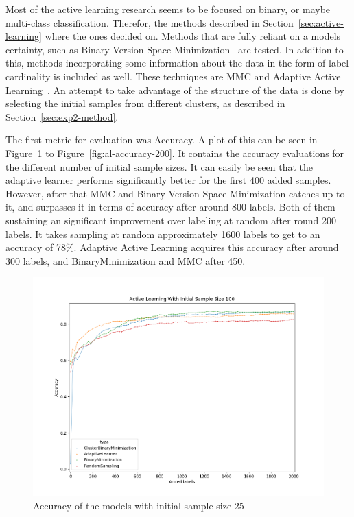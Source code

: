 Most of the active learning research seems to be focused on binary, or maybe multi-class classification.
Therefor, the methods described in Section~\ref{sec:active-learning} where the ones decided on.
Methods that are fully reliant on a models certainty, such as Binary Version Space Minimization~\cite{brinker2006active} are tested.
In addition to this, methods incorporating some information about the data in the form of label cardinality is included as well.
These techniques are MMC and Adaptive Active Learning~\cite{yang2009effective, li2013active}.
An attempt to take advantage of the structure of the data is done by selecting the initial samples from different clusters, as described in Section~\ref{sec:exp2-method}.

The first metric for evaluation was Accuracy.
A plot of this can be seen in Figure~\ref{fig:al-accuracy-25} to Figure~\ref{fig:al-accuracy-200}.
It contains the accuracy evaluations for the different number of initial sample sizes.
It can easily be seen that the adaptive learner performs significantly better for the first 400 added samples.
However, after that MMC and Binary Version Space Minimization catches up to it, and surpasses it in terms of accuracy after around 800 labels.
Both of them sustaining an significant improvement over labeling at random after round 200 labels.
It takes sampling at random approximately 1600 labels to get to an accuracy of 78\%.
Adaptive Active Learning acquires this accuracy after around 300 labels, and BinaryMinimization and MMC after 450.

\begin{figure}
    \centering
    \includegraphics[scale=0.5]{figures/al-25-accuracy.png}
    \caption{Accuracy of the models with initial sample size 25}
    \label{fig:al-accuracy-25}
\end{figure}

